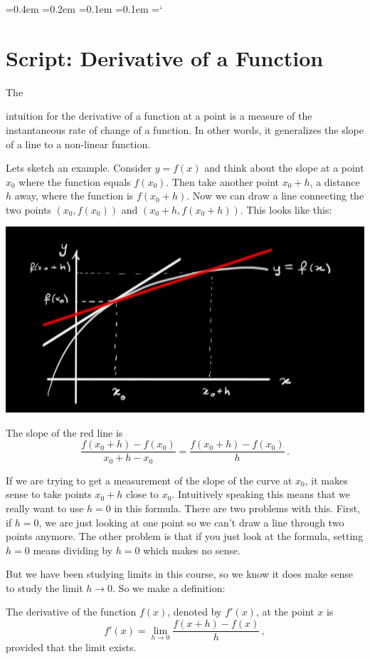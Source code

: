 {\ttfamily
{}\font=0.4em
\font=0.2em
\font=0.1em
\font=0.1em
\hyphenchar\font=`\-



\section*{Script: Derivative of a Function}

\thispagestyle{empty}


\hypertarget{The Derivative}{The} intuition for the derivative of a function at a point is  
a measure of the instantaneous rate of change of a function. In other words, it generalizes
the slope of a line to a non-linear function. 

Lets sketch an example. Consider $y=f(x)$ and think about the slope at a point $x_0$ where the function
equals $f(x_0)$. Then take another point $x_0+h$, a distance $h$ away, where the function is $f(x_0+h)$.
Now we can draw a line connecting the two points $(x_0,f(x_0))$ and $(x_0+h,f(x_0+h))$. This looks like this:

\begin{center}
\includegraphics[scale=.4]{slope_red.jpg}
\end{center} 
 
\noindent 
The slope of the red line is
$$
\frac{f(x_0+h)-f(x_0)}{x_0+h-x_0}=\frac{f(x_0+h)-f(x_0)}{h}\, .
$$ 

If we are trying to get a measurement of the slope of the curve at $x_0$, it makes sense to take points $x_0+h$
close to $x_0$. Intuitively speaking this means that we really want to use $h=0$ in this formula. There are two problems 
with this. First, if $h=0$, we are just looking at one point so we can't draw a line through two points anymore. The other problem
is that if you just look at the formula, setting $h=0$ means dividing by $h=0$ which makes no sense.


\newpage
\thispagestyle{empty}

But we have been studying limits in this course, so we know it does make sense to study the limit $h\to 0$. So we make a definition:
}
\begin{definition}
The derivative of the function $f(x)$, denoted by $f'(x)$, at the point $x$ is
$$
f'(x)=\lim_{h\to 0}\frac{f(x+h)-f(x)}{h}\, ,
$$
provided that the limit exists.
\end{definition}



\newpage